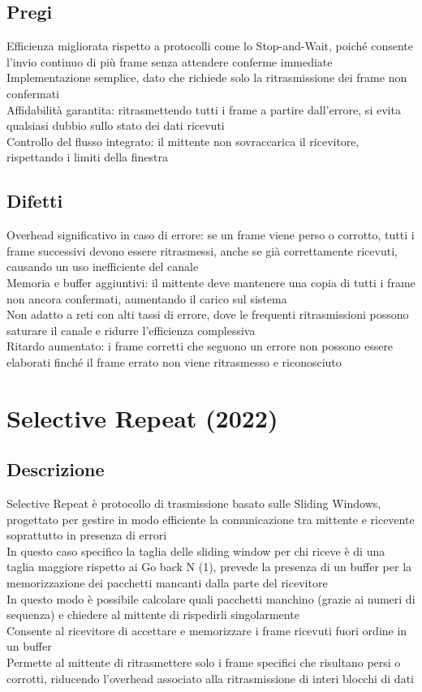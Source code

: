 \documentclass[10pt,oneside,a4paper]{article}
\begin{document}
\subsection{Pregi}
Efficienza migliorata rispetto a protocolli come lo Stop-and-Wait, poiché consente l'invio continuo di più frame senza attendere conferme immediate\\
Implementazione semplice, dato che richiede solo la ritrasmissione dei frame non confermati\\
Affidabilità garantita: ritrasmettendo tutti i frame a partire dall'errore, si evita qualsiasi dubbio sullo stato dei dati ricevuti\\
Controllo del flusso integrato: il mittente non sovraccarica il ricevitore, rispettando i limiti della finestra
\subsection{Difetti}
Overhead significativo in caso di errore: se un frame viene perso o corrotto, tutti i frame successivi devono essere ritrasmessi, anche se già correttamente ricevuti, causando un uso inefficiente del canale\\
Memoria e buffer aggiuntivi: il mittente deve mantenere una copia di tutti i frame non ancora confermati, aumentando il carico sul sistema\\
Non adatto a reti con alti tassi di errore, dove le frequenti ritrasmissioni possono saturare il canale e ridurre l'efficienza complessiva\\
Ritardo aumentato: i frame corretti che seguono un errore non possono essere elaborati finché il frame errato non viene ritrasmesso e riconosciuto
\section{Selective Repeat (2022)}
\subsection{Descrizione}
Selective Repeat è protocollo di trasmissione basato sulle Sliding Windows, progettato per gestire in modo efficiente la comunicazione tra mittente e ricevente soprattutto in presenza di errori\\
In questo caso specifico la taglia delle sliding window per chi riceve è di una taglia maggiore rispetto ai Go back N (1), prevede la presenza di un buffer per la memorizzazione dei pacchetti mancanti dalla parte del ricevitore\\
In questo modo è possibile calcolare quali pacchetti manchino (grazie ai numeri di sequenza) e chiedere al mittente di rispedirli singolarmente\\
Consente al ricevitore di accettare e memorizzare i frame ricevuti fuori ordine in un buffer\\
Permette al mittente di ritrasmettere solo i frame specifici che risultano persi o corrotti, riducendo l'overhead associato alla ritrasmissione di interi blocchi di dati
\end{document}

